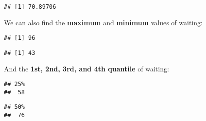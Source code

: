 \documentclass[
]{book}
\newenvironment{Shaded}{\begin{snugshade}}{\end{snugshade}}
\newcommand{\FloatTok}[1]{\textcolor[rgb]{0.00,0.00,0.81}{#1}}
\newcommand{\FunctionTok}[1]{\textcolor[rgb]{0.00,0.00,0.00}{#1}}
\newcommand{\NormalTok}[1]{#1}
\newcommand{\SpecialCharTok}[1]{\textcolor[rgb]{0.00,0.00,0.00}{#1}}
\begin{document}
\begin{verbatim}
## [1] 70.89706
\end{verbatim}

We can also find the \textbf{maximum} and \textbf{minimum} values of waiting:

\begin{Shaded}
\end{Shaded}

\begin{verbatim}
## [1] 96
\end{verbatim}

\begin{Shaded}
\end{Shaded}

\begin{verbatim}
## [1] 43
\end{verbatim}

And the \textbf{1st, 2nd, 3rd, and 4th quantile} of waiting:

\begin{Shaded}
\end{Shaded}

\begin{verbatim}
## 25% 
##  58
\end{verbatim}

\begin{Shaded}
\end{Shaded}

\begin{verbatim}
## 50% 
##  76
\end{verbatim}

\begin{Shaded}
\end{Shaded}
\end{document}
